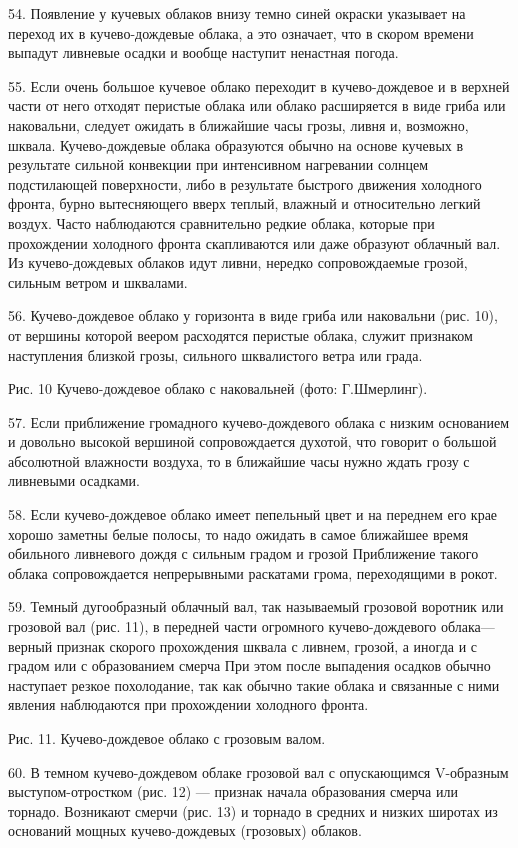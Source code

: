 54. Появление у кучевых облаков внизу темно синей окраски указывает на переход их в кучево-дождевые облака, а это означает, что в скором времени выпадут ливневые осадки и вообще наступит ненастная погода.

55. Если очень большое кучевое облако переходит в кучево-дождевое и в верхней части от него отходят перистые облака или облако расширяется в виде гриба или наковальни, следует ожидать в ближайшие часы грозы, ливня и, возможно, шквала. Кучево-дождевые облака образуются обычно на основе кучевых в результате сильной конвекции при интенсивном нагревании солнцем подстилающей поверхности, либо в результате быстрого движения холодного фронта, бурно вытесняющего вверх теплый, влажный и относительно легкий воздух. Часто наблюдаются сравнительно редкие облака, которые при прохождении холодного фронта скапливаются или даже образуют облачный вал. Из кучево-дождевых облаков идут ливни, нередко сопровождаемые грозой, сильным ветром и шквалами.

56. Кучево-дождевое облако у горизонта в виде гриба или наковальни (рис. 10), от вершины которой веером расходятся перистые облака, служит признаком наступления близкой грозы, сильного шквалистого ветра или града.


Рис. 10 Кучево-дождевое облако с наковальней (фото: Г.Шмерлинг).

57. Если приближение громадного кучево-дождевого облака с низким основанием и довольно высокой вершиной сопровождается духотой, что говорит о большой абсолютной влажности воздуха, то в ближайшие часы нужно ждать грозу с ливневыми осадками.

58. Если кучево-дождевое облако имеет пепельный цвет и на переднем его крае хорошо заметны белые полосы, то надо ожидать в самое ближайшее время обильного ливневого дождя с сильным градом и грозой Приближение такого облака сопровождается непрерывными раскатами грома, переходящими в рокот.

59. Темный дугообразный облачный вал, так называемый грозовой воротник или грозовой вал (рис. 11), в передней части огромного кучево-дождевого облака—верный признак скорого прохождения шквала с ливнем, грозой, а иногда и с градом или с образованием смерча При этом после выпадения осадков обычно наступает резкое похолодание, так как обычно такие облака и связанные с ними явления наблюдаются при прохождении холодного фронта.


Рис. 11. Кучево-дождевое облако с грозовым валом.

60. В темном кучево-дождевом облаке грозовой вал с опускающимся V-образным выступом-отростком (рис. 12) — признак начала образования смерча или торнадо. Возникают смерчи (рис. 13) и торнадо в средних и низких широтах из оснований мощных кучево-дождевых (грозовых) облаков.


